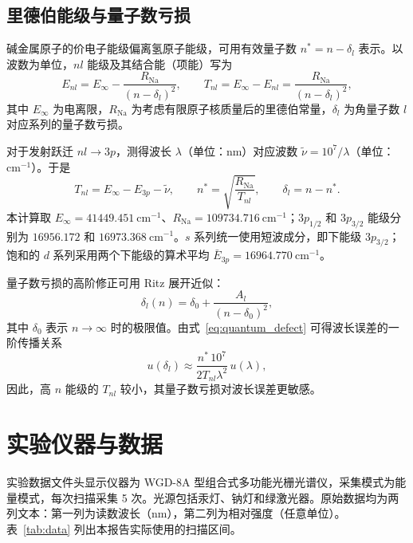 \documentclass[UTF8,a4paper,11pt]{ctexart}
\begin{document}
\subsection{里德伯能级与量子数亏损}
碱金属原子的价电子能级偏离氢原子能级，可用有效量子数 $n^*=n-\delta_l$ 表示。以波数为单位，$nl$ 能级及其结合能（项能）写为
\begin{equation}
  E_{nl}=E_\infty-\frac{R_{\mathrm{Na}}}{(n-\delta_l)^2},
  \qquad T_{nl}=E_\infty-E_{nl}=\frac{R_{\mathrm{Na}}}{(n-\delta_l)^2},
  \label{eq:rydberg}
\end{equation}
其中 $E_\infty$ 为电离限，$R_{\mathrm{Na}}$ 为考虑有限原子核质量后的里德伯常量，$\delta_l$ 为角量子数 $l$ 对应系列的量子数亏损。

对于发射跃迁 $nl\to3p$，测得波长 $\lambda$（单位：$\mathrm{nm}$）对应波数 $\tilde\nu=10^7/\lambda$（单位：$\mathrm{cm^{-1}}$）。于是
\begin{equation}
  T_{nl}=E_\infty-E_{3p}-\tilde\nu,
  \qquad n^*=\sqrt{\frac{R_{\mathrm{Na}}}{T_{nl}}},
  \qquad \delta_l=n-n^*.
  \label{eq:quantum_defect}
\end{equation}
本计算取 $E_\infty=41449.451\ \mathrm{cm^{-1}}$、$R_{\mathrm{Na}}=109734.716\ \mathrm{cm^{-1}}$；$3p_{1/2}$ 和 $3p_{3/2}$ 能级分别为 $16956.172$ 和 $16973.368\ \mathrm{cm^{-1}}$\cite{na_levels}。$s$ 系列统一使用短波成分，即下能级 $3p_{3/2}$；饱和的 $d$ 系列采用两个下能级的算术平均 $\bar E_{3p}=16964.770\ \mathrm{cm^{-1}}$。

量子数亏损的高阶修正可用 Ritz 展开近似：
\begin{equation}
  \delta_l(n)=\delta_0+\frac{A_l}{(n-\delta_0)^2},
  \label{eq:ritz}
\end{equation}
其中 $\delta_0$ 表示 $n\to\infty$ 时的极限值。由式~\eqref{eq:quantum_defect} 可得波长误差的一阶传播关系
\begin{equation}
  u(\delta_l)\approx\frac{n^*\,10^7}{2T_{nl}\lambda^2}\,u(\lambda),
  \label{eq:delta_uncertainty}
\end{equation}
因此，高 $n$ 能级的 $T_{nl}$ 较小，其量子数亏损对波长误差更敏感。

\section{实验仪器与数据}
实验数据文件头显示仪器为 WGD-8A 型组合式多功能光栅光谱仪，采集模式为能量模式，每次扫描采集 5 次。光源包括汞灯、钠灯和绿激光器。原始数据均为两列文本：第一列为读数波长（$\mathrm{nm}$），第二列为相对强度（任意单位）。表~\ref{tab:data} 列出本报告实际使用的扫描区间。
\end{document}
